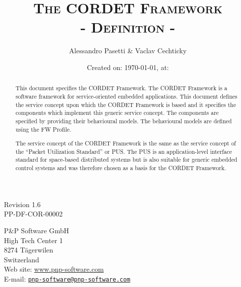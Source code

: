 \documentclass[a4paper,10pt]{article}
\title{\textsc{The CORDET Framework} \\ \textsc{- Definition -}}
\author{Alessandro Pasetti \& Vaclav Cechticky}
\date{Created on: \today{}, at: \currenttime{}}
\newcommand{\docIssue}{1.6}						%
\newcommand{\docRefNumber}{PP-DF-COR-00002}		%
\begin{document}
\maketitle

\begin{center}
Revision \docIssue{}\\
\docRefNumber{}
\end{center}

\vspace{1cm}

\begin{center}
P\&P Software GmbH \\
High Tech Center 1 \\
8274 T\"{a}gerwilen \\
Switzerland \\
\vspace{2mm}
Web site: \url{www.pnp-software.com}\\
E-mail: \href{mailto:pnp-software@pnp-software.com}{\nolinkurl{pnp-software@pnp-software.com}} 
\end{center}

\vspace{1.2cm}

\begin{table}[ht]
\begin{center}
\begin{tabular}{p{11.7cm}}
\\
\hline
\end{tabular}
\end{center}
\end{table}
\begin{abstract}
This document specifies the CORDET Framework. The CORDET Framework is a software framework for service-oriented embedded applications. This document defines the service concept upon which the CORDET Framework is based and it specifies the components which implement this generic service concept. The components are specified by providing their behavioural models. The behavioural models are defined using the FW Profile.
\par
The service concept of the CORDET Framework is the same as the service concept of the “Packet Utilization Standard” or PUS. The PUS is an application-level interface standard for space-based distributed systems but is also suitable for generic embedded control systems and was therefore chosen as a basis for the CORDET Framework.
\end{abstract}
\begin{table}[ht]
\begin{center}
\begin{tabular}{p{11.7cm}}
\\
\hline
\end{tabular}
\end{center}
\end{table}
\end{document}
